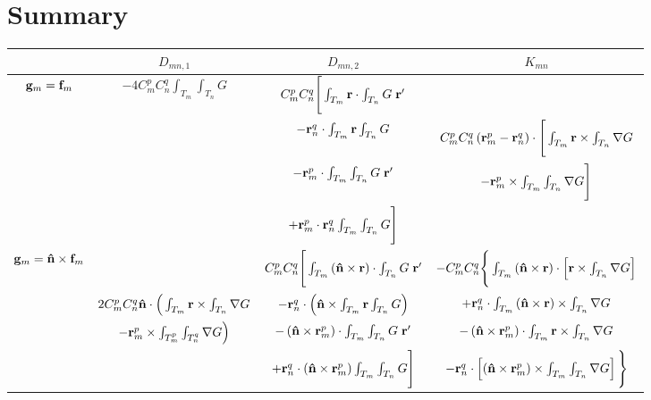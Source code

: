 \section{Summary}
\begin{table}[h!]
\centering
\begin{tabular}{|c||c|c|c|}
  \hline
& $D_{mn,1}$ & $D_{mn,2}$ & $K_{mn}$ \\
  \hline
\multirow{4}{*}{$\mathbf{g}_m = \mathbf{f}_m$} & \multirow{4}{*}{$-4 C_m^p C_n^q \int_{T_m} \int_{T_n} G$} & $C_m^p C_n^q  \Bigg[\int_{T_m} \mathbf{r} \cdot \int_{T_n} G \; \mathbf{r}'$ & \\
& & $- \mathbf{r}_n^q \cdot \int_{T_m} \mathbf{r} \int_{T_n} G$ & $C_m^p C_n^q \left(\mathbf{r}_m^p - \mathbf{r}_n^q\right) \cdot \Bigg[\int_{T_m} \mathbf{r} \times \int_{T_n} \nabla G$ \\
& & $- \mathbf{r}_m^p  \cdot \int_{T_m} \int_{T_n} G \; \mathbf{r}'$ & $- \mathbf{r}_m^p \times \int_{T_m} \int_{T_n}\nabla G \Bigg]$\\
& & $+ \mathbf{r}_m^p \cdot \mathbf{r}_n^q \int_{T_m} \int_{T_n} G \Bigg]$ & \\
  \hline
\multirow{4}{*}{$\mathbf{g}_m = \mathbf{\Hat{n}}\times\mathbf{f}_m$} &  & $C_m^p C_n^q  \Bigg[\int_{T_m} \left(\mathbf{\Hat{n}} \times \mathbf{r} \right) \cdot \int_{T_n} G \; \mathbf{r}'$ & $-C_m^p C_n^q \Bigg\{ \int_{T_m} \left(\mathbf{\Hat{n}} \times \mathbf{r}\right) \cdot \left[\mathbf{r} \times \int_{T_n} \nabla G \right]$\\
& $2C_m^p C_n^q\mathbf{\Hat{n}} \cdot \Big(\int_{T_m} \mathbf{r} \times \int_{T_n} \nabla G$ & $- \mathbf{r}_n^q \cdot \left(\mathbf{\Hat{n}} \times \int_{T_m} \mathbf{r} \int_{T_n} G \right) $ & $+ \mathbf{r}_n^q \cdot \int_{T_m} \left(\mathbf{\Hat{n}} \times \mathbf{r}\right) \times \int_{T_n} \nabla G$\\
& $- \mathbf{r}_m^p \times \int_{T_m^p} \int_{T_n^q} \nabla G \Big)$ & $- \left(\mathbf{\Hat{n}} \times \mathbf{r}_m^p\right)  \cdot \int_{T_m} \int_{T_n} G \; \mathbf{r}'$ & $- \left(\mathbf{\Hat{n}}\times\mathbf{r}_m^p \right) \cdot \int_{T_m} \mathbf{r} \times \int_{T_n} \nabla G$\\
& & $+ \mathbf{r}_n^q \cdot \left(\mathbf{\Hat{n}} \times \mathbf{r}_m^p\right) \int_{T_m} \int_{T_n} G \Bigg]$ & $-\mathbf{r}_n^q \cdot \left[\left(\mathbf{\Hat{n}} \times \mathbf{r}_m^p \right) \times \int_{T_m} \int_{T_n}\nabla G \right]\Bigg\}$\\
  \hline

\end{tabular}
\end{table}


